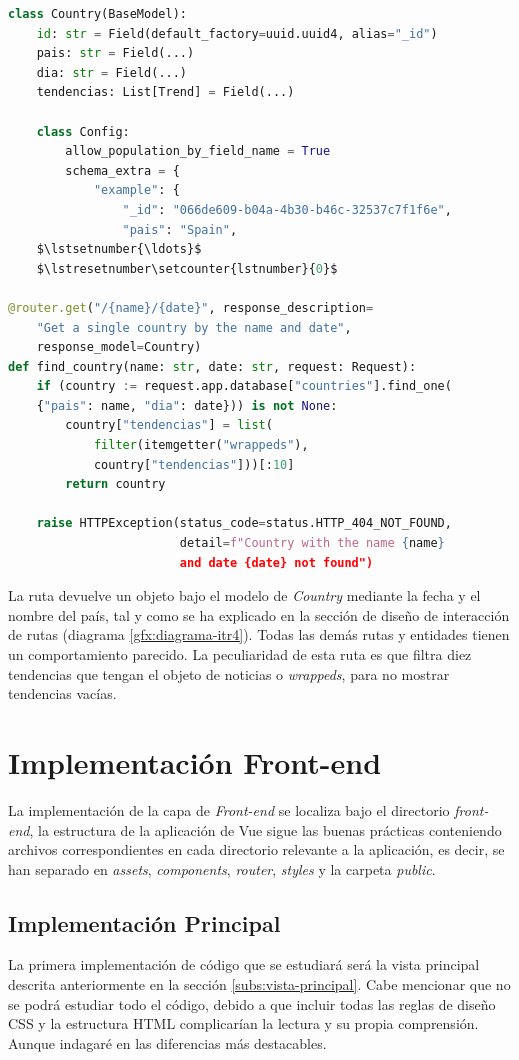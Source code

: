 \begin{lstlisting}[caption=Modelo \textit{Country} y ejemplo de ruta,language=Python, mathescape=true]
class Country(BaseModel):
    id: str = Field(default_factory=uuid.uuid4, alias="_id")
    pais: str = Field(...)
    dia: str = Field(...)
    tendencias: List[Trend] = Field(...)

    class Config:
        allow_population_by_field_name = True
        schema_extra = {
            "example": {
                "_id": "066de609-b04a-4b30-b46c-32537c7f1f6e",
                "pais": "Spain",
    $\lstsetnumber{\ldots}$
    $\lstresetnumber\setcounter{lstnumber}{0}$

@router.get("/{name}/{date}", response_description=
    "Get a single country by the name and date",
    response_model=Country)
def find_country(name: str, date: str, request: Request):
    if (country := request.app.database["countries"].find_one(
    {"pais": name, "dia": date})) is not None:
        country["tendencias"] = list(
            filter(itemgetter("wrappeds"),
            country["tendencias"]))[:10]
        return country

    raise HTTPException(status_code=status.HTTP_404_NOT_FOUND,
                        detail=f"Country with the name {name} 
                        and date {date} not found")
\end{lstlisting}

La ruta devuelve un objeto bajo el modelo de \textit{Country} mediante la fecha y el nombre del país, tal y como se ha explicado en la sección de diseño de interacción de rutas (diagrama \ref{gfx:diagrama-itr4}). Todas las demás rutas y entidades tienen un comportamiento parecido. La peculiaridad de esta ruta es que filtra diez tendencias que tengan el objeto de noticias o \textit{wrappeds}, para no mostrar tendencias vacías.

\section{Implementación Front-end}
La implementación de la capa de \textit{Front-end} se localiza bajo el directorio \textit{front-end}, la estructura de la aplicación de Vue sigue las buenas prácticas conteniendo archivos correspondientes en cada directorio relevante a la aplicación, es decir, se han separado en \textit{assets}, \textit{components}, \textit{router}, \textit{styles} y la carpeta \textit{public}.

\subsection{Implementación Principal}
La primera implementación de código que se estudiará será la vista principal descrita anteriormente en la sección \ref{subs:vista-principal}. Cabe mencionar que no se podrá estudiar todo el código, debido a que incluir todas las reglas de diseño CSS y la estructura HTML complicarían la lectura y su propia comprensión. Aunque indagaré en las diferencias más destacables.

